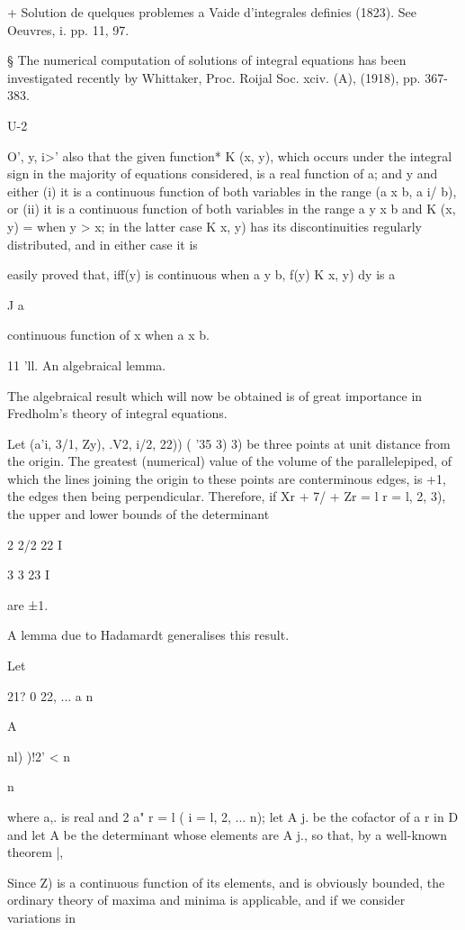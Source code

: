 + Solution de quelques problemes a Vaide d'integrales definies (1823).
See Oeuvres, i. pp. 11, 97.

§ The numerical computation of solutions of integral equations has
been investigated recently by Whittaker, Proc. Roijal Soc. xciv. (A),
(1918), pp. 367-383.

U-2

%
%

O', y, i>' also that the given function* K (x, y), which occurs under
the integral sign in the majority of equations considered, is a real
function of a; and y and either (i) it is a continuous function of
both variables in the range (a x b, a i/ b), or (ii) it is a
continuous function of both variables in the range a y x b and K (x,
y) = when y > x; in the latter case K x, y) has its discontinuities
regularly distributed, and in either case it is

easily proved that, iff(y) is continuous when a y b, f(y) K x, y) dy
is a

J a

continuous function of x when a x b.

11 'll. An algebraical lemma.

The algebraical result which will now be obtained is of great
importance in Fredholm's theory of integral equations.

Let (a'i, 3/1, Zy), .V2, i/2, 22)) ( '35 3) 3) be three points at
unit distance from the origin. The greatest (numerical) value of the
volume of the parallelepiped, of which the lines joining the origin to
these points are conterminous edges, is +1, the edges then being
perpendicular. Therefore, if Xr + 7/ + Zr = l r = l, 2, 3), the upper
and lower bounds of the determinant

 2 2/2 22 I

 3 3 23 I

are ±1.

A lemma due to Hadamardt generalises this result.

Let

 21? 0 22, ... a n

A

 nl) )!2'  < n

n

where a,. is real and 2 a" r = l ( i = l, 2, ... n); let A j. be the
cofactor of a r in D and let A be the determinant whose elements are A
j., so that, by a well-known theorem |,

Since Z) is a continuous function of its elements, and is obviously
bounded, the ordinary theory of maxima and minima is applicable, and
if we consider variations in

